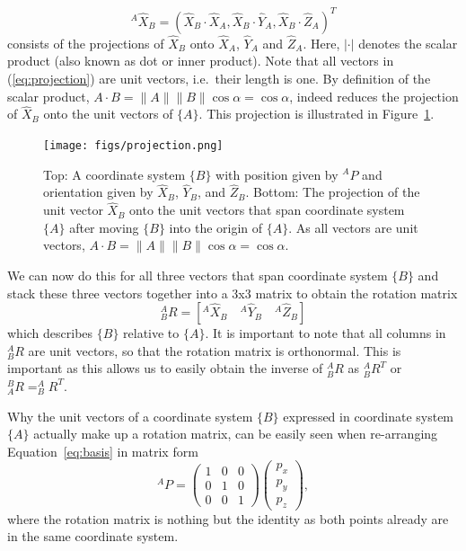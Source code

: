 \begin{equation}\label{eq:projection}
^A\hat{X}_B=(\hat{X}_B\cdot\hat{X}_A, \hat{X}_B\cdot\hat{Y}_A,\hat{X}_B\cdot\hat{Z}_A)^T
\end{equation}
consists of the projections of $\hat{X}_B$ onto $\hat{X}_A$, $\hat{Y}_A$ and $\hat{Z}_A$. Here,  $|\cdot|$ denotes the scalar product (also known as dot or inner product).  Note that all vectors in (\ref{eq:projection}) are unit vectors, i.e.\ their length is one. By definition of the scalar product, $A\cdot B=\|A\|\|B\|\cos \alpha=\cos \alpha$, indeed reduces the projection of $\hat{X}_B$ onto the unit vectors of $\{A\}$. This projection is illustrated in Figure~\ref{fig:projection}.

\begin{figure}
	\centering
		\texttt{[image: figs/projection.png]}
	\caption{Top: A coordinate system $\{B\}$ with position given by $^AP$ and orientation given by $\hat{X}_B$, $\hat{Y}_B$, and $\hat{Z}_B$. Bottom:
	The projection of the unit vector $\hat{X}_B$ onto the unit vectors that span coordinate system $\{A\}$ after moving $\{B\}$ into the origin of $\{A\}$. As all vectors are unit vectors, $A\cdot B=\|A\|\|B\|\cos \alpha=\cos \alpha$. }
	\label{fig:projection}
\end{figure}

We can now do this for all three vectors that span coordinate system $\{B\}$ and stack these three vectors together into a 3x3 matrix to obtain the rotation matrix
%
\begin{equation}
^A_BR=[^A\hat{X}_B \quad ^A\hat{Y}_B \quad ^A\hat{Z}_B]
\end{equation}
%
which describes $\{B\}$ relative to $\{A\}$. It is important to note that all columns in $ ^A_BR$ are unit vectors, so that the rotation matrix is orthonormal. This is important as this allows us to easily obtain the inverse of $ ^A_BR$ as $ ^A_BR^T$ or
$ ^B_AR=^A_BR^T$.

Why the unit vectors of a coordinate system $\{B\}$ expressed in coordinate system $\{A\}$ actually make up a rotation matrix, can be easily seen when re-arranging Equation~\ref{eq:basis} in matrix form
\begin{equation}
^AP=\left(\begin{array}{ccc}1 & 0 & 0\\0 & 1 & 0\\0 & 0 & 1\end{array}\right)\left(\begin{array}{c}p_x\\p_y\\p_z\end{array}\right),
\end{equation}
where the rotation matrix is nothing but the identity as both points already are in the same coordinate system.

